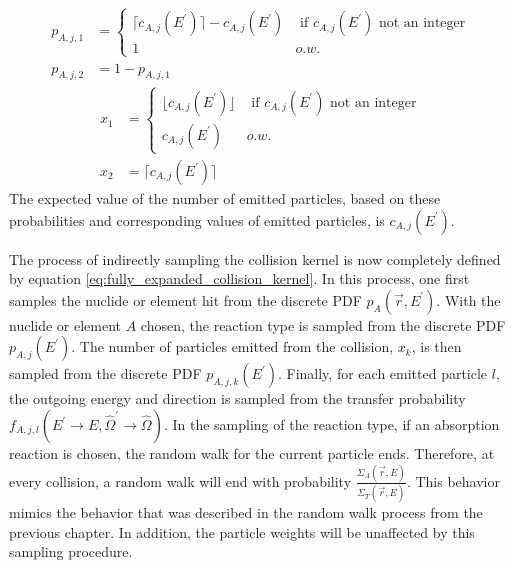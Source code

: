 \begin{align}
  p_{A,j,1} & =
  \begin{cases}
    \lceil c_{A,j}(E^{'}) \rceil - c_{A,j}(E^{'}) & \text{ if } c_{A,j}(E^{'})
    \text{ not an integer} \\
    1 & o.w.
  \end{cases} \\
  p_{A,j,2} & = 1 - p_{A,j,1}
\end{align}
\begin{align}
  x_1 & = 
  \begin{cases}
    \lfloor c_{A,j}(E^{'}) \rfloor & \text{ if } c_{A,j}(E^{'})
    \text{ not an integer} \\
    c_{A,j}(E^{'}) & o.w.
  \end{cases} \\
  x_2 & = \lceil c_{A,j}(E^{'}) \rceil
\end{align}
The expected value of the number of emitted particles, based on these probabilities and corresponding values of emitted particles, is $c_{A,j}(E^{'})$.

The process of indirectly sampling the collision kernel is now completely
defined by equation \ref{eq:fully_expanded_collision_kernel}. In this process,
one first samples the nuclide or element hit from the discrete PDF 
$p_A(\vec{r},E^{'})$. With the nuclide or element $A$ chosen, the reaction type 
is sampled from the discrete PDF $p_{A,j}(E^{'})$. The number of particles 
emitted from the collision, $x_k$, is then sampled from the discrete PDF 
$p_{A,j,k}(E^{'})$. Finally, for each emitted particle $l$, the outgoing energy 
and direction is sampled from the transfer probability 
$f_{A,j,l}(E^{'} \to E,\hat{\Omega}^{'} \to \hat{\Omega})$. In the sampling of the
reaction type, if an absorption reaction is chosen, the random walk for the 
current particle ends. Therefore, at every collision, a random walk will end 
with probability $\frac{\Sigma_A(\vec{r},E)}{\Sigma_T(\vec{r},E)}$. This 
behavior mimics the behavior that was described in the random walk process from 
the previous chapter. In addition, the particle weights will be unaffected by 
this sampling procedure.  

